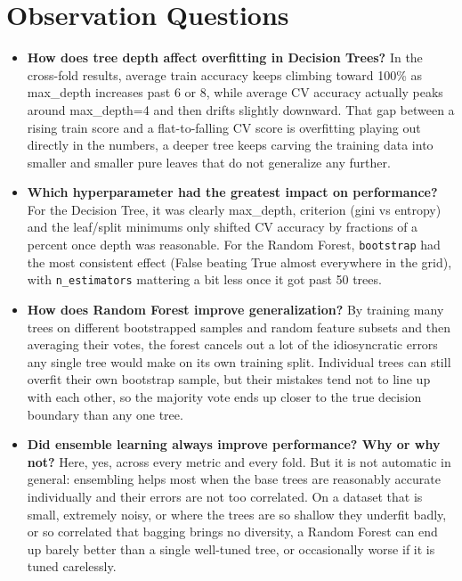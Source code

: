 \documentclass[12pt,a4paper]{article}
\begin{document}
\section{Observation Questions}
\begin{itemize}
\item \textbf{How does tree depth affect overfitting in Decision Trees?} In the cross-fold results,
average train accuracy keeps climbing toward 100\% as max\_depth increases past 6 or 8, while average
CV accuracy actually peaks around max\_depth=4 and then drifts slightly downward. That gap between a
rising train score and a flat-to-falling CV score is overfitting playing out directly in the numbers,
a deeper tree keeps carving the training data into smaller and smaller pure leaves that do not
generalize any further.
\item \textbf{Which hyperparameter had the greatest impact on performance?} For the Decision Tree, it
was clearly max\_depth, criterion (gini vs entropy) and the leaf/split minimums only shifted CV
accuracy by fractions of a percent once depth was reasonable. For the Random Forest,
\texttt{bootstrap} had the most consistent effect (False beating True almost everywhere in the grid),
with \texttt{n\_estimators} mattering a bit less once it got past 50 trees.
\item \textbf{How does Random Forest improve generalization?} By training many trees on
different bootstrapped samples and random feature subsets and then averaging their votes, the
forest cancels out a lot of the idiosyncratic errors any single tree would make on its own training
split. Individual trees can still overfit their own bootstrap sample, but their mistakes tend not to
line up with each other, so the majority vote ends up closer to the true decision boundary than any
one tree.
\item \textbf{Did ensemble learning always improve performance? Why or why not?} Here, yes, across
every metric and every fold. But it is not automatic in general: ensembling helps most when the base
trees are reasonably accurate individually and their errors are not too correlated. On a dataset
that is small, extremely noisy, or where the trees are so shallow they underfit badly, or so
correlated that bagging brings no diversity, a Random Forest can end up barely better than a single
well-tuned tree, or occasionally worse if it is tuned carelessly.
\end{itemize}
\end{document}
